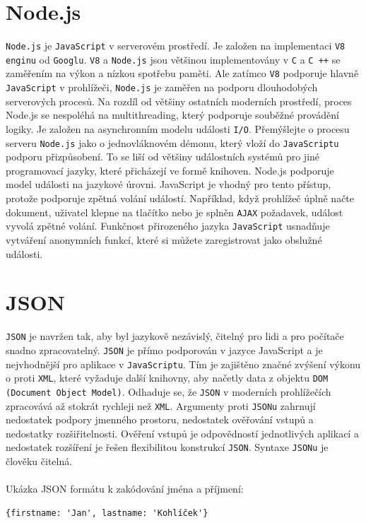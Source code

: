 \documentclass[czech,BP]{thesiskiv}
\begin{document}
		\section{Node.js}
		\texttt{Node.js} je \texttt{JavaScript} v serverovém prostředí. Je založen na implementaci \texttt{V8 enginu} od \texttt{Googlu}. \texttt{V8} a \texttt{Node.js} jsou většinou implementovány v \texttt{C} a \texttt{C ++} se zaměřením na výkon a nízkou spotřebu paměti. Ale zatímco \texttt{V8} podporuje hlavně \texttt{JavaScript} v prohlížeči, \texttt{Node.js} je zaměřen na podporu dlouhodobých serverových procesů.
Na rozdíl od většiny ostatních moderních prostředí, proces Node.js se nespoléhá na multithreading, který podporuje souběžné provádění logiky. Je založen na asynchronním modelu události \texttt{I/O}. Přemýšlejte o procesu serveru \texttt{Node.js} jako o jednovláknovém démonu, který vloží do \texttt{JavaScriptu} podporu přizpůsobení. To se liší od většiny událostních systémů pro jiné programovací jazyky, které přicházejí ve formě knihoven. Node.js podporuje model události na jazykové úrovni. JavaScript je vhodný pro tento přístup, protože podporuje zpětná volání událostí. Například, když prohlížeč úplně načte dokument, uživatel klepne na tlačítko nebo je splněn \texttt{AJAX} požadavek, událost vyvolá zpětné volání. Funkčnost přirozeného jazyka \texttt{JavaScript} usnadňuje vytváření anonymních funkcí, které si můžete zaregistrovat jako obslužné události.\cite{tilkov2010node}
	
		\section{JSON}
			\texttt{JSON} je navržen tak, aby byl jazykově nezávislý, čitelný pro lidi a pro počítače snadno zpracovatelný. \texttt{JSON} je přímo podporován v jazyce JavaScript a je nejvhodnější pro aplikace v \texttt{JavaScriptu}. Tím je zajištěno značné zvýšení výkonu o proti \texttt{XML}, které vyžaduje další knihovny, aby načetly data z objektu \texttt{DOM (Document Object Model)}. Odhaduje se, že \texttt{JSON} v moderních prohlížečích zpracovává až stokrát rychleji než \texttt{XML}. Argumenty proti \texttt{JSONu} zahrnují nedostatek podpory jmenného prostoru, nedostatek ověřování vstupů a nedostatky rozšiřitelnosti. Ověření vstupů je odpovědností jednotlivých aplikací a nedostatek rozšíření je řešen flexibilitou konstrukcí \texttt{JSON}. Syntaxe \texttt{JSONu} je člověku čitelná.\cite{nurseitov2009comparison}		
\\\\	
Ukázka JSON formátu k zakódování jména a příjmení:
\begin{verbatim}
{firstname: 'Jan', lastname: 'Kohlíček'}
\end{verbatim}
\end{document}
